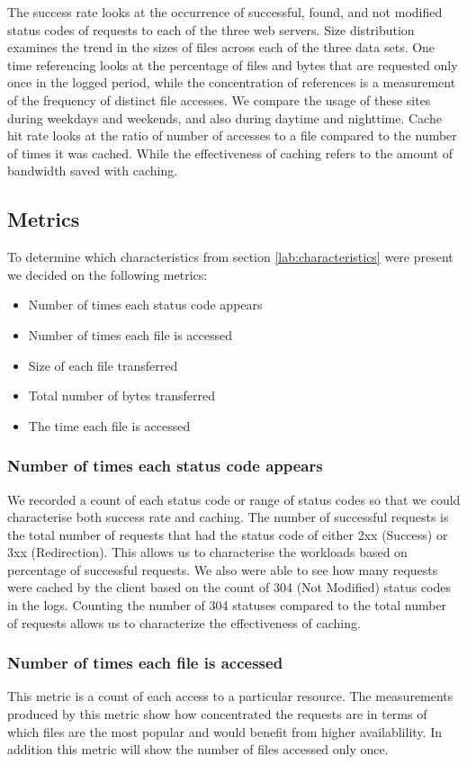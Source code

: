 \documentclass[10pt,conference]{IEEEtran}
\begin{document}
The success rate looks at the occurrence of successful, found, and not modified status codes of requests to each of the three web servers. Size distribution examines the trend in the sizes of files across each of the three data sets. One time referencing looks at the percentage of files and bytes that are requested only once in the logged period, while the concentration of references is a measurement of the frequency of distinct file accesses. We compare the usage of these sites during weekdays and weekends, and also during daytime and nighttime.
Cache hit rate looks at the ratio of number of accesses to a file compared to the number of times it was cached. While the effectiveness of caching refers to the amount of bandwidth saved with caching.

\subsection{Metrics}
To determine which characteristics from section \ref{lab:characteristics} were present we decided on the following metrics:
\begin{itemize}[noitemsep]
    \item Number of times each status code appears
    \item Number of times each file is accessed
    \item Size of each file transferred
    \item Total number of bytes transferred
    \item The time each file is accessed
\end{itemize}

\subsubsection{Number of times each status code appears}
We recorded a count of each status code or range of status codes so that we could characterise both success rate and caching.
The number of successful requests is the total number of requests that had the status code of either 2xx (Success) or 3xx (Redirection). This allows us to characterise the workloads based on percentage of successful requests.
We also were able to see how many requests were cached by the client based on the count of 304 (Not Modified) status codes in the logs. Counting the number of 304 statuses compared to the total number of requests allows us to characterize the effectiveness of caching.

\subsubsection{Number of times each file is accessed}
This metric is a count of each access to a particular resource.
The measurements produced by this metric show how concentrated the requests are in terms of which files are the most popular and would benefit from higher availablility. In addition this metric will show the number of files accessed only once.
\end{document}
